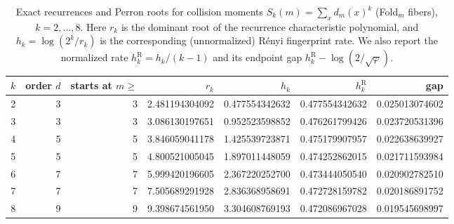 \begin{table}[H]
\centering
\scriptsize
\setlength{\tabcolsep}{6pt}
\caption{Exact recurrences and Perron roots for collision moments $S_k(m)=\sum_x d_m(x)^k$ (Fold$_m$ fibers), $k=2,\dots,8$. Here $r_k$ is the dominant root of the recurrence characteristic polynomial, and $h_k=\log(2^k/r_k)$ is the corresponding (unnormalized) R\'enyi fingerprint rate. We also report the normalized rate $h_k^{\mathrm R}=h_k/(k-1)$ and its endpoint gap $h_k^{\mathrm R}-\log(2/\sqrt{\varphi})$.}
\label{tab:fold_collision_moment_spectrum_k2_8}
\begin{tabular}{r r r r r r r}
\toprule
$k$ & order $d$ & starts at $m\ge$ & $r_k$ & $h_k$ & $h_k^{\mathrm R}$ & gap\\
\midrule
2 & 3 & 3 & 2.481194304092 & 0.477554342632 & 0.477554342632 & 0.025013074602\\
3 & 3 & 3 & 3.086130197651 & 0.952523598852 & 0.476261799426 & 0.023720531396\\
4 & 5 & 5 & 3.846059041178 & 1.425539723871 & 0.475179907957 & 0.022638639927\\
5 & 5 & 5 & 4.800521005045 & 1.897011448059 & 0.474252862015 & 0.021711593984\\
6 & 7 & 7 & 5.999420196605 & 2.367220252700 & 0.473444050540 & 0.020902782510\\
7 & 7 & 7 & 7.505689291928 & 2.836368958691 & 0.472728159782 & 0.020186891752\\
8 & 9 & 9 & 9.398674561950 & 3.304608769193 & 0.472086967028 & 0.019545698997\\
\bottomrule
\end{tabular}
\end{table}
